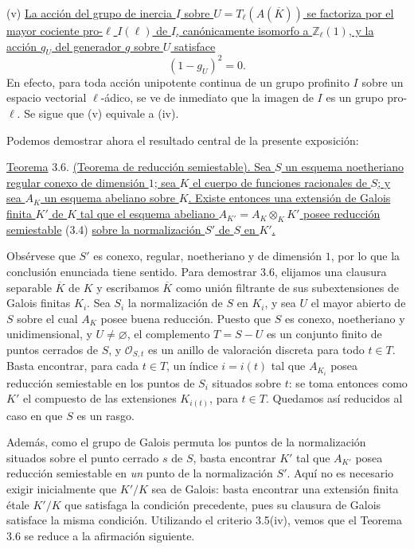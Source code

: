 \smallskip
\noindent
(v) \underline{La acción del grupo de inercia $I$ sobre
$U=T_\ell(A(\overline K))$ se factoriza por el mayor cociente
pro-$\ell$ $I(\ell)$ de $I$, canónicamente isomorfo a
$\mathbb Z_\ell(1)$, y la acción $g_U$ del
generador $g$ sobre $U$ satisface}
\begin{equation}\tag{3.5.3}
 (1-g_U)^2=0.
\end{equation}
En efecto, para toda acción unipotente continua de un grupo profinito
$I$ sobre un espacio vectorial $\ell$-ádico, se ve de inmediato que la
imagen de $I$ es un grupo pro-$\ell$. Se sigue que (v) equivale a (iv).

Podemos demostrar ahora el resultado central de la presente exposición:

\medskip
\noindent
\underline{Teorema} 3.6. \underline{(Teorema de reducción semiestable).
Sea $S$ un esquema noetheriano regular conexo de dimensión $1$; sea $K$
el cuerpo de funciones racionales de $S$; y sea $A_K$ un esquema
abeliano sobre $K$. Existe entonces una extensión de Galois finita $K'$
de $K$ tal que el esquema abeliano
$A_{K'}=A_K\otimes_KK'$ posee reducción semiestable} (3.4)
\underline{sobre la normalización $S'$ de $S$ en $K'$.}

Obsérvese que $S'$ es conexo, regular, noetheriano y de dimensión $1$,
por lo que la conclusión enunciada tiene sentido. Para demostrar 3.6,
elijamos una clausura separable $\overline K$ de $K$ y escribamos
$\overline K$ como unión filtrante de sus subextensiones de Galois
finitas $K_i$. Sea $S_i$ la normalización de $S$ en $K_i$, y sea $U$
el mayor abierto de $S$ sobre el cual $A_K$ posee buena reducción.
Puesto que $S$ es conexo, noetheriano y unidimensional, y
$U\ne\varnothing$, el complemento $T=S-U$ es un conjunto finito de
puntos cerrados de $S$, y $\mathcal O_{S,t}$ es un anillo de valoración
discreta para todo $t\in T$. Basta encontrar, para cada $t\in T$, un
índice $i=i(t)$ tal que $A_{K_i}$ posea reducción semiestable en los
puntos de $S_i$ situados sobre $t$: se toma entonces como $K'$ el
compuesto de las extensiones $K_{i(t)}$, para $t\in T$. Quedamos así
reducidos al caso en que $S$ es un rasgo.

Además, como el grupo de Galois permuta los puntos de la normalización
situados sobre el punto cerrado $s$ de $S$, basta encontrar $K'$ tal
que $A_{K'}$ posea reducción semiestable en \emph{un} punto de la
normalización $S'$. Aquí no es necesario exigir inicialmente que $K'/K$
sea de Galois: basta encontrar una extensión finita étale $K'/K$ que
satisfaga la condición precedente, pues su clausura de Galois satisface
la misma condición. Utilizando el criterio 3.5(iv), vemos que el Teorema
3.6 se reduce a la afirmación siguiente.

